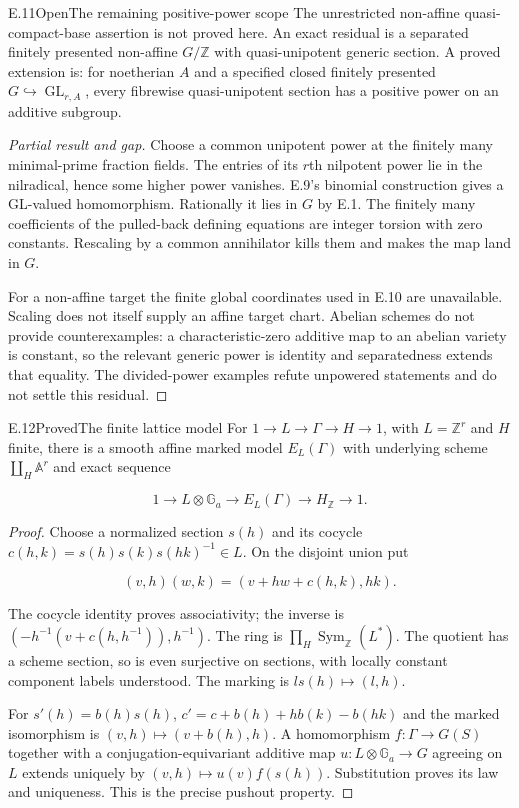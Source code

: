 \begin{statement}{E.11}{Open}{The remaining positive-power scope}
The unrestricted non-affine quasi-compact-base assertion
is not proved here. An exact residual is a separated
finitely presented non-affine $G/\mathbb Z$ with
quasi-unipotent generic section.
A proved extension is: for noetherian $A$ and a specified
closed finitely presented $G\hookrightarrow\operatorname{GL}_{r,A}$,
every fibrewise quasi-unipotent section has a positive
power on an additive subgroup.
\end{statement}
\begin{proof}[Partial result and gap]
Choose a common unipotent power at the finitely many
minimal-prime fraction fields. The entries of its
$r$th nilpotent power lie in the nilradical, hence some
higher power vanishes. E.9's binomial construction
gives a GL-valued homomorphism. Rationally it lies in
$G$ by E.1. The finitely many coefficients of the pulled-back
defining equations are integer torsion with zero constants.
Rescaling by a common annihilator kills them and makes
the map land in $G$.

For a non-affine target the finite global coordinates
used in E.10 are unavailable. Scaling does not itself
supply an affine target chart. Abelian schemes do not
provide counterexamples: a characteristic-zero additive
map to an abelian variety is constant, so the relevant
generic power is identity and separatedness extends
that equality. The divided-power examples refute
unpowered statements and do not settle this residual.
\end{proof}

\begin{statement}{E.12}{Proved}{The finite lattice model}
For $1\to L\to\Gamma\to H\to1$, with $L=\mathbb Z^r$
and $H$ finite, there is a smooth affine marked model
$E_L(\Gamma)$ with underlying scheme
$\coprod_H\mathbb A^r$ and exact sequence

$$
1\to L\otimes\mathbb G_a\to E_L(\Gamma)\to H_{\mathbb Z}\to1.
$$

\end{statement}
\begin{proof}
Choose a normalized section $s(h)$ and its cocycle
$c(h,k)=s(h)s(k)s(hk)^{-1}\in L$.
On the disjoint union put

$$
(v,h)(w,k)=(v+hw+c(h,k),hk).
$$

The cocycle identity proves associativity; the inverse is
$(-h^{-1}(v+c(h,h^{-1})),h^{-1})$.
The ring is $\prod_H\operatorname{Sym}_{\mathbb Z}(L^*)$.
The quotient has a scheme section, so is even surjective
on sections, with locally constant component labels understood.
The marking is $ls(h)\mapsto(l,h)$.

For $s'(h)=b(h)s(h)$,
$c'=c+b(h)+hb(k)-b(hk)$ and the marked isomorphism is
$(v,h)\mapsto(v+b(h),h)$.
A homomorphism $f:\Gamma\to G(S)$ together with a
conjugation-equivariant additive map
$u:L\otimes\mathbb G_a\to G$ agreeing on $L$ extends
uniquely by $(v,h)\mapsto u(v)f(s(h))$.
Substitution proves its law and uniqueness.
This is the precise pushout property.
\end{proof}

